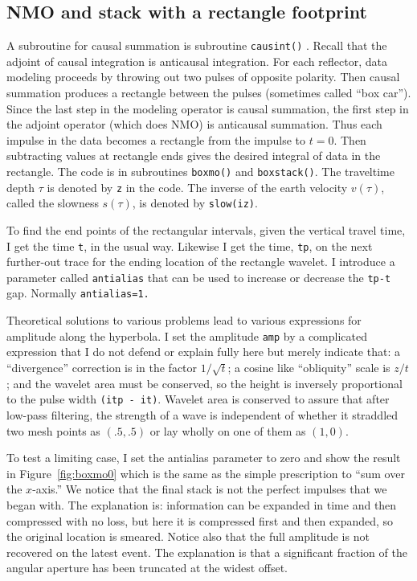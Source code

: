 \subsection{NMO and stack with a rectangle footprint}

\par

A subroutine for causal summation is subroutine \texttt{causint()} .
Recall that the
adjoint of causal integration is anticausal integration.
For each reflector,
data modeling proceeds by throwing out two pulses of opposite polarity.
Then causal summation produces a rectangle between the pulses
(sometimes called ``box car'').
Since the last step in the modeling operator
is causal summation,
the first step in the adjoint operator (which does NMO) is
anticausal summation.
Thus each impulse in the data becomes a rectangle from the impulse to $t=0$.
Then subtracting values at rectangle ends gives the desired integral of data
in the rectangle.
The code is in subroutines {\tt boxmo()}
and {\tt boxstack()}.
The traveltime depth $\tau$ is denoted by {\tt z} in the code.
The inverse of the earth velocity $v(\tau)$,
called the slowness $s(\tau )$, is denoted by {\tt slow(iz)}.

\par
To find the end points of the rectangular intervals,
given the vertical travel time,
I get the time {\tt t}, in the usual way.
Likewise I get the time, {\tt tp}, on the next further-out trace
for the ending location of the rectangle wavelet.
I introduce a parameter called {\tt antialias} that
can be used to increase or decrease the {\tt tp-t} gap.
Normally {\tt antialias=1.}

\par
Theoretical solutions to various problems lead to various
expressions for amplitude along the hyperbola.
I set the amplitude {\tt amp} by a complicated expression
that I do not defend or explain fully here but merely indicate that:
a ``divergence'' correction is in the factor $1/\sqrt{t}$;
a cosine like ``obliquity'' scale is $z/t$;
and the wavelet area must be conserved, so the height is
inversely proportional to the pulse width {\tt (itp - it)}.
Wavelet area is conserved to assure that after low-pass filtering,
the strength of a wave is independent of whether it straddled
two mesh points as $(.5,.5)$ or lay wholly on one of them as $(1,0)$.

\par
To test a limiting case,
I set the antialias parameter to zero
and show the result in Figure~\ref{fig:boxmo0}
which is the same as the simple prescription to ``sum over the $x$-axis.''
We notice that the final stack is not the perfect impulses that we began with.
The explanation is:
information can be expanded in time and then compressed with no loss,
but here it is compressed first and then expanded,
so the original location is smeared.
Notice also that
the full amplitude is not recovered on the latest event.
The explanation is that a significant fraction of the angular
aperture has been truncated at the widest offset.


